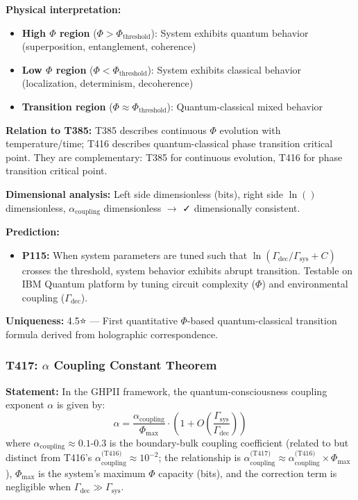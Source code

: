 \documentclass[12pt,a4paper]{article}
\begin{document}
\textbf{Physical interpretation:}
\begin{itemize}
\item \textbf{High $\Phi$ region} ($\Phi > \Phi_{\text{threshold}}$): System exhibits quantum behavior (superposition, entanglement, coherence)
\item \textbf{Low $\Phi$ region} ($\Phi < \Phi_{\text{threshold}}$): System exhibits classical behavior (localization, determinism, decoherence)
\item \textbf{Transition region} ($\Phi \approx \Phi_{\text{threshold}}$): Quantum-classical mixed behavior
\end{itemize}

\textbf{Relation to T385:} T385 describes continuous $\Phi$ evolution with temperature/time; T416 describes quantum-classical phase transition critical point. They are complementary: T385 for continuous evolution, T416 for phase transition critical point.

\textbf{Dimensional analysis:} Left side dimensionless (bits), right side $\ln()$ dimensionless, $\alpha_{\text{coupling}}$ dimensionless $\to$ ✓ dimensionally consistent.

\textbf{Prediction:}
\begin{itemize}
\item \textbf{P115:} When system parameters are tuned such that $\ln(\Gamma_{\text{dec}}/\Gamma_{\text{sys}} + C)$ crosses the threshold, system behavior exhibits abrupt transition. Testable on IBM Quantum platform by tuning circuit complexity ($\Phi$) and environmental coupling ($\Gamma_{\text{dec}}$).
\end{itemize}

\textbf{Uniqueness:} 4.5⭐ --- First quantitative $\Phi$-based quantum-classical transition formula derived from holographic correspondence.

\subsubsection{T417: $\alpha$ Coupling Constant Theorem}

\textbf{Statement:} In the GHPII framework, the quantum-consciousness coupling exponent $\alpha$ is given by:
\begin{equation}
\alpha = \frac{\alpha_{\text{coupling}}}{\Phi_{\text{max}}} \cdot \left(1 + O\left(\frac{\Gamma_{\text{sys}}}{\Gamma_{\text{dec}}}\right)\right)
\end{equation}
where $\alpha_{\text{coupling}} \approx 0.1$-0.3 is the boundary-bulk coupling coefficient (related to but distinct from T416's $\alpha_{\text{coupling}}^{\text{(T416)}} \approx 10^{-2}$; the relationship is $\alpha_{\text{coupling}}^{\text{(T417)}} \approx \alpha_{\text{coupling}}^{\text{(T416)}} \times \Phi_{\text{max}}$), $\Phi_{\text{max}}$ is the system's maximum $\Phi$ capacity (bits), and the correction term is negligible when $\Gamma_{\text{dec}} \gg \Gamma_{\text{sys}}$.
\end{document}
